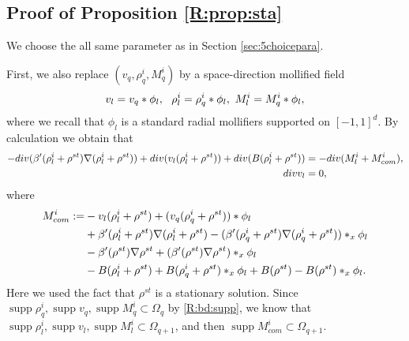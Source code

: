\documentclass[10pt,a4paper]{amsart}
\numberwithin{equation}{section}
\DeclareMathOperator{\supp}{supp}
\def\div{\mathord{{\rm div}}}
\def\div{\mathord{{\rm div}}}
\begin{document}
  


\subsection{Proof of Proposition \ref{R:prop:sta}}  
We choose the all same parameter as in Section \ref{sec:5choicepara}.

First,  we also replace $(v_{q},  \rho^i_{q},M^i_q)$ by a space-direction mollified field  
\begin{align}
v_l=v_{q}*\phi_l,\ \ 
   \rho^i_l=  \rho^i_{q}*\phi_l,\  M^i_l=M^i_{q}* \phi_l,\notag
\end{align}
where we recall that $\phi_l$ is a   standard radial mollifiers supported on $[-1,1]^d$.  
By calculation we obtain that 
\begin{align*}
-\div(\beta'(\rho^i _l+\rho^{st}) \nabla(\rho^i _l+\rho^{st}))+\div(v_l   (\rho^i _l+\rho^{st}))+\div(B(\rho^i _l+\rho^{st}))&=-\div (M^i_l+M^i_{com} ),\\
\div v_l&=0,
\end{align*}
where
\begin{align*}
M^i_{com} :=&-v_l  ( \rho^i_l+\rho^{st})+(v_{q}  ( \rho^i_{q}+\rho^{st}))* \phi_l\\
&+\beta'(\rho^i _l+\rho^{st}) \nabla(\rho^i _l+\rho^{st})-(\beta'(\rho^i _q+\rho^{st}) \nabla(\rho^i _q+\rho^{st}))*_x\phi_l\\
&-\beta'(\rho^{st}) \nabla\rho^{st}+(\beta'(\rho^{st}) \nabla\rho^{st})*_x\phi_l\\
 &  -B(\rho_l^i+\rho^{st})+B(\rho_q^i+\rho^{st})*_x\phi_l +B(\rho^{st})-B(\rho^{st})*_x\phi_l.\notag
\end{align*}
 Here we used the fact that $\rho^{st}$ is a stationary solution. Since $  \supp\rho_q^i,\supp v_q,\supp M_q^i\subset\Omega_q $ by \eqref{R:bd:supp}, we know that $  \supp\rho_l^i,\supp v_l,\supp M_l^i\subset\Omega_{q+1} $, and then $\supp M_{com}^i\subset\Omega_{q+1} $. 
 
\end{document}
